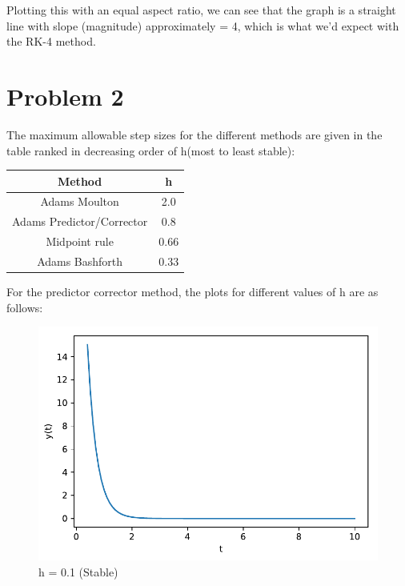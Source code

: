 \documentclass[12pt,letterpaper]{article}
\begin{document}
Plotting this with an equal aspect ratio, we can see that the graph is a straight line with slope (magnitude) approximately = 4, which is what we'd expect with the RK-4 method.


\newpage

\section*{Problem 2}

The maximum allowable step sizes for the different methods are given in the table ranked in decreasing order of h(most to least stable):

\begin{center}
\begin{tabular}{c c}
\hline
Method						&		h\\
\hline
Adams Moulton				&		2.0\\
Adams Predictor/Corrector	&		0.8\\
Midpoint rule				&		0.66\\
Adams Bashforth				&		0.33\\
\hline
\end{tabular}
\end{center}

For the predictor corrector method, the plots for different values of h are as follows:

\begin{figure}[H]
\centering
\includegraphics[scale=0.65]{"../h=01"}
\caption{h = 0.1 (Stable)}
\end{figure}
\end{document}
